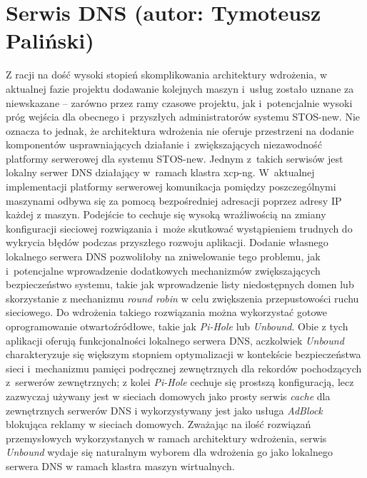 \section{Serwis DNS (autor: Tymoteusz Paliński)}
Z racji na dość wysoki stopień skomplikowania architektury wdrożenia, w aktualnej fazie projektu dodawanie kolejnych maszyn i~usług zostało uznane za niewskazane -- zarówno przez ramy czasowe projektu, jak i~potencjalnie wysoki próg wejścia dla obecnego i~przyszłych administratorów systemu STOS-new. Nie oznacza to jednak, że architektura wdrożenia nie oferuje przestrzeni na dodanie komponentów usprawniających działanie i~zwiększających niezawodność platformy serwerowej dla systemu STOS-new.
\newline \noindent Jednym z~takich serwisów jest lokalny serwer DNS działający w~ramach klastra xcp-ng. W~aktualnej
implementacji platformy serwerowej komunikacja pomiędzy poszczególnymi maszynami odbywa się za pomocą bezpośredniej adresacji poprzez adresy IP każdej z maszyn. Podejście to cechuje się wysoką wrażliwością na zmiany konfiguracji sieciowej rozwiązania i~może skutkować wystąpieniem trudnych do wykrycia błędów podczas przyszłego rozwoju aplikacji. Dodanie własnego lokalnego serwera DNS pozwoliłoby na zniwelowanie tego problemu, jak i~potencjalne wprowadzenie dodatkowych mechanizmów zwiększających bezpieczeństwo systemu, takie jak wprowadzenie listy niedostępnych domen lub skorzystanie z mechanizmu \textit{round robin} w celu zwiększenia przepustowości ruchu sieciowego\cite{roundRobin}.
\newline \noindent Do wdrożenia takiego rozwiązania można wykorzystać gotowe oprogramowanie otwartoźródłowe, takie jak \textit{Pi-Hole} lub \textit{Unbound}\cite{pihole, unboundDns}. Obie z tych aplikacji oferują funkcjonalności lokalnego serwera DNS, aczkolwiek \textit{Unbound} charakteryzuje się większym stopniem optymalizacji w kontekście bezpieczeństwa sieci i~mechanizmu pamięci podręcznej zewnętrznych dla rekordów pochodzących z~serwerów zewnętrznych; z kolei \textit{Pi-Hole} cechuje się prostszą konfiguracją, lecz zazwyczaj używany jest w sieciach domowych jako prosty serwis \textit{cache} dla zewnętrznych serwerów DNS i wykorzystywany jest jako usługa \textit{AdBlock} blokująca reklamy w sieciach domowych. Zważając na ilość rozwiązań przemysłowych wykorzystanych w ramach architektury wdrożenia, serwis \textit{Unbound} wydaje się naturalnym wyborem dla wdrożenia go jako lokalnego serwera DNS w ramach klastra maszyn wirtualnych.

